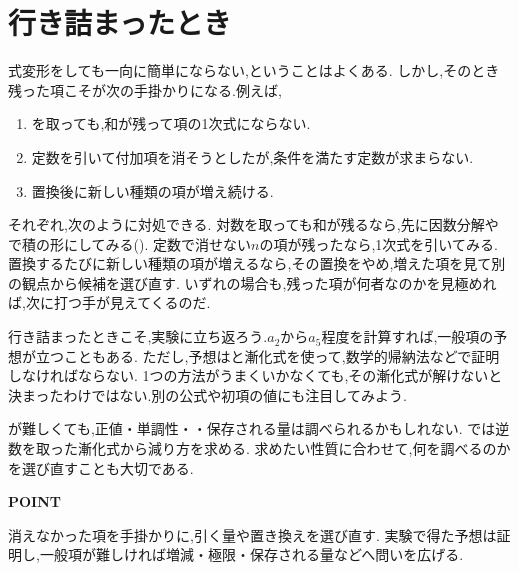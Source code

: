\section{行き詰まったとき}\label{節：行き詰まったとき}

式変形をしても一向に簡単にならない,ということはよくある.
しかし,そのとき残った項こそが次の手掛かりになる.例えば,
\begin{enumerate}
  \item {}を取っても,和が残って項の1次式にならない.
  \item 定数を引いて付加項を消そうとしたが,条件を満たす定数が求まらない.
  \item 置換後に新しい種類の項が増え続ける.
\end{enumerate}
それぞれ,次のように対処できる.
対数を取っても和が残るなら,先に因数分解やで積の形にしてみる().
定数で消せない$n$の項が残ったなら,1次式を引いてみる.
置換するたびに新しい種類の項が増えるなら,その置換をやめ,増えた項を見て別の観点から候補を選び直す.
いずれの場合も,残った項が何者なのかを見極めれば,次に打つ手が見えてくるのだ.
\BookFigFallback

行き詰まったときこそ,実験に立ち返ろう.$a_2$から$a_5$程度を計算すれば,一般項の予想が立つこともある.
ただし,予想はと漸化式を使って,数学的帰納法などで証明しなければならない.
1つの方法がうまくいかなくても,その漸化式が解けないと決まったわけではない.別の公式や初項の値にも注目してみよう.

が難しくても,正値・単調性・・保存される量は調べられるかもしれない.
では逆数を取った漸化式から減り方を求める.
求めたい性質に合わせて,何を調べるのかを選び直すことも大切である.

\begin{bookpoint}
  \textbf{POINT}\par
  消えなかった項を手掛かりに,引く量や置き換えを選び直す.
  実験で得た予想は証明し,一般項が難しければ増減・極限・保存される量などへ問いを広げる.
\end{bookpoint}
